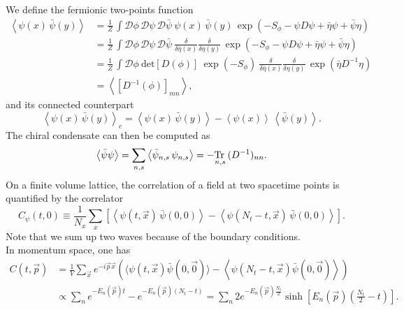 We define the fermionic two-points function
\begin{equation} 
\begin{aligned}
    \left\langle \psi(x) \, \bar\psi(y) \right\rangle 
    &= \frac{1}{Z} \, \int \mathcal{D}\phi \, \mathcal{D}\psi \, \mathcal{D}\bar\psi \ \psi(x) \, \bar\psi(y) \, \exp \left( - S_\phi - \psi D \psi + \bar\eta \psi + \bar \psi \eta \right) \\
    &= \frac{1}{Z} \, \int \mathcal{D}\phi \, \mathcal{D}\psi \, \mathcal{D}\bar\psi \ \frac{\delta}{\delta \bar \eta(x)} \frac{\delta}{\delta \eta(y)} \, \exp \left( - S_\phi - \psi D \psi + \bar\eta \psi + \bar \psi \eta \right) \\
    &= \frac{1}{Z} \, \int \mathcal{D}\phi \ \text{det}\left[D(\phi)\right] \ \exp \left( - S_\phi \right) \ \frac{\delta}{\delta \bar \eta(x)} \frac{\delta}{\delta \eta(y)} \, \exp\left( \bar\eta D^{-1} \eta \right) \\
    &= \left\langle \left[D^{-1}(\phi)\right]_{mn}\right\rangle,
\end{aligned}
\label{eq:D_inv_condensate}
\end{equation}
and its connected counterpart
\begin{equation*}
    \left\langle \psi(x) \, \bar\psi(y) \right\rangle_c = \left\langle \psi(x) \, \bar\psi(y) \right\rangle  - \left\langle \psi(x) \right\rangle \, \left\langle\bar\psi(y) \right\rangle .
\end{equation*}
The chiral condensate can then be computed as
\begin{equation*}
    \left\langle  \bar\psi \psi \right\rangle = \underset{n,s}\sum  \left\langle \bar\psi_{n,s} \, \psi_{n,s} \right\rangle = -\underset{n,s}{\operatorname{\text{Tr} \,}} \, (D^{-1})_{nn}.
\end{equation*}
On a finite volume lattice, the correlation of a field at two spacetime points is quantified by the correlator
\begin{equation}
    C_\psi(t,0) \equiv \frac{1}{N_x} \sum_{x} \left[\left\langle \psi(t, \vec{x}) \, \bar\psi(0,0)\right\rangle - \left\langle \psi(N_t-t, \vec{x}) \, \bar\psi(0,0)\right\rangle \right] .
    \label{eq:correlator_definition}
\end{equation}
Note that we sum up two waves because of the boundary conditions. \\
In momentum space, one has
\begin{equation*} 
    \begin{aligned}
        C(t, \vec{p}) & =\frac{1}{V} \sum_{\vec{x}} e^{-i \vec{p} \vec{x}}\left(\langle\psi(t, \vec{x}) \bar{\psi}(0, \vec{0})\rangle-\left\langle\psi\left(N_t-t, \vec{x}\right) \bar{\psi}(0, \vec{0})\right\rangle\right) \\
        & \propto \sum_n e^{-E_n(\vec{p}) t}-e^{-E_n(\vec{p})\left(N_t-t\right)}=\sum_n 2 e^{-E_n(\vec{p}) \frac{N_t}{2}} \sinh \left[E_n(\vec{p})\left(\frac{N_t}{2}-t\right)\right] .
    \end{aligned}
\end{equation*}
